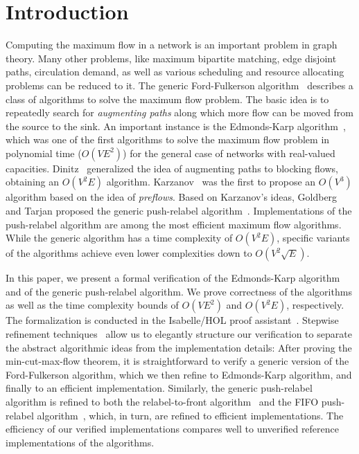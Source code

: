\documentclass[smallcondensed]{svjour3}     %
\begin{document}
\section{Introduction}
Computing the maximum flow in a network is an important problem in graph theory.
Many other problems, like maximum bipartite matching, edge disjoint paths, circulation demand, as well as various scheduling and resource allocating problems can be reduced to it.
The generic Ford-Fulkerson algorithm~\cite{FF56} describes a class of algorithms to solve the maximum flow problem. 
The basic idea is to repeatedly search for \emph{augmenting paths} along which more flow can be moved from the source to the sink.
An important instance is the Edmonds-Karp algorithm~\cite{EK72},
which was one of the first algorithms to solve the maximum flow problem in polynomial time ($O(VE^2)$) for the general case of networks with real-valued capacities.
Dinitz~\cite{Di06} generalized the idea of augmenting paths to blocking flows, obtaining an $O(V^2E)$ algorithm. 
Karzanov~\cite{Ka74} was the first to propose an $O(V^3)$ algorithm based on the idea of \emph{preflows}. Based on Karzanov's ideas, Goldberg and Tarjan proposed
the generic push-relabel algorithm~\cite{GoTa88}.
Implementations of the push-relabel algorithm are among the most efficient maximum flow algorithms. While the generic algorithm has a time complexity of $O(V^2E)$,
specific variants of the algorithms achieve even lower complexities down to $O(V^2\sqrt{E})$.

In this paper, we present a formal verification of the Edmonds-Karp algorithm and of the generic push-relabel algorithm.
We prove correctness of the algorithms as well as the time complexity bounds of $O(VE^2)$ and $O(V^2E)$, respectively. 
The formalization is conducted in the Isabelle/HOL proof assistant~\cite{NPW02}. 
Stepwise refinement techniques~\cite{Wirth71,Back78,BaWr98} allow us to elegantly structure our verification to separate the abstract algorithmic ideas from
the implementation details: After proving the min-cut-max-flow theorem, it is straightforward to verify a generic version of the Ford-Fulkerson algorithm,
which we then refine to Edmonds-Karp algorithm, and finally to an efficient implementation. 
Similarly, the generic push-relabel algorithm is refined to both the relabel-to-front algorithm~\cite{CLRS09} and the FIFO push-relabel algorithm~\cite{GoTa88},
which, in turn, are refined to efficient implementations. The efficiency of our verified implementations compares well to unverified reference implementations of 
the algorithms.
\end{document}
